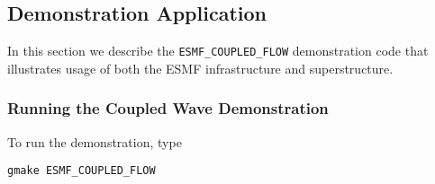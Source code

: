 \subsection{Demonstration Application}
\label{sec:demo}

In this section we describe the {\tt ESMF\_COUPLED\_FLOW} demonstration 
code that illustrates usage of both the ESMF infrastructure and superstructure.
\subsubsection{Running the Coupled Wave Demonstration}

To run the demonstration, type 

\begin{verbatim}
gmake ESMF_COUPLED_FLOW
\end{verbatim}






























